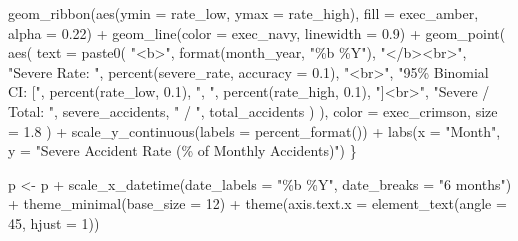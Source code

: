 \documentclass[
  letterpaper,
  DIV=11,
  numbers=noendperiod]{scrartcl}
\newenvironment{Shaded}{\begin{snugshade}}{\end{snugshade}}
\newcommand{\AttributeTok}[1]{\textcolor[rgb]{0.40,0.45,0.13}{#1}}
\newcommand{\DecValTok}[1]{\textcolor[rgb]{0.68,0.00,0.00}{#1}}
\newcommand{\FloatTok}[1]{\textcolor[rgb]{0.68,0.00,0.00}{#1}}
\newcommand{\FunctionTok}[1]{\textcolor[rgb]{0.28,0.35,0.67}{#1}}
\newcommand{\NormalTok}[1]{\textcolor[rgb]{0.00,0.23,0.31}{#1}}
\newcommand{\OtherTok}[1]{\textcolor[rgb]{0.00,0.23,0.31}{#1}}
\newcommand{\SpecialCharTok}[1]{\textcolor[rgb]{0.37,0.37,0.37}{#1}}
\newcommand{\StringTok}[1]{\textcolor[rgb]{0.13,0.47,0.30}{#1}}
\begin{document}
\begin{Shaded}
\begin{Highlighting}[]
        \FunctionTok{geom\_ribbon}\NormalTok{(}\FunctionTok{aes}\NormalTok{(}\AttributeTok{ymin =}\NormalTok{ rate\_low, }\AttributeTok{ymax =}\NormalTok{ rate\_high), }\AttributeTok{fill =}\NormalTok{ exec\_amber, }\AttributeTok{alpha =} \FloatTok{0.22}\NormalTok{) }\SpecialCharTok{+}
        \FunctionTok{geom\_line}\NormalTok{(}\AttributeTok{color =}\NormalTok{ exec\_navy, }\AttributeTok{linewidth =} \FloatTok{0.9}\NormalTok{) }\SpecialCharTok{+}
        \FunctionTok{geom\_point}\NormalTok{(}
          \FunctionTok{aes}\NormalTok{(}
            \AttributeTok{text =} \FunctionTok{paste0}\NormalTok{(}
              \StringTok{"\textless{}b\textgreater{}"}\NormalTok{, }\FunctionTok{format}\NormalTok{(month\_year, }\StringTok{"\%b \%Y"}\NormalTok{), }\StringTok{"\textless{}/b\textgreater{}\textless{}br\textgreater{}"}\NormalTok{,}
              \StringTok{"Severe Rate: "}\NormalTok{, }\FunctionTok{percent}\NormalTok{(severe\_rate, }\AttributeTok{accuracy =} \FloatTok{0.1}\NormalTok{), }\StringTok{"\textless{}br\textgreater{}"}\NormalTok{,}
              \StringTok{"95\% Binomial CI: ["}\NormalTok{, }\FunctionTok{percent}\NormalTok{(rate\_low, }\FloatTok{0.1}\NormalTok{), }\StringTok{", "}\NormalTok{, }\FunctionTok{percent}\NormalTok{(rate\_high, }\FloatTok{0.1}\NormalTok{), }\StringTok{"]\textless{}br\textgreater{}"}\NormalTok{,}
              \StringTok{"Severe / Total: "}\NormalTok{, severe\_accidents, }\StringTok{" / "}\NormalTok{, total\_accidents}
\NormalTok{            )}
\NormalTok{          ),}
          \AttributeTok{color =}\NormalTok{ exec\_crimson, }\AttributeTok{size =} \FloatTok{1.8}
\NormalTok{        ) }\SpecialCharTok{+}
        \FunctionTok{scale\_y\_continuous}\NormalTok{(}\AttributeTok{labels =} \FunctionTok{percent\_format}\NormalTok{()) }\SpecialCharTok{+}
        \FunctionTok{labs}\NormalTok{(}\AttributeTok{x =} \StringTok{"Month"}\NormalTok{, }\AttributeTok{y =} \StringTok{"Severe Accident Rate (\% of Monthly Accidents)"}\NormalTok{)}
\NormalTok{    \}}

\NormalTok{    p }\OtherTok{\textless{}{-}}\NormalTok{ p }\SpecialCharTok{+}
      \FunctionTok{scale\_x\_datetime}\NormalTok{(}\AttributeTok{date\_labels =} \StringTok{"\%b \%Y"}\NormalTok{, }\AttributeTok{date\_breaks =} \StringTok{"6 months"}\NormalTok{) }\SpecialCharTok{+}
      \FunctionTok{theme\_minimal}\NormalTok{(}\AttributeTok{base\_size =} \DecValTok{12}\NormalTok{) }\SpecialCharTok{+}
      \FunctionTok{theme}\NormalTok{(}\AttributeTok{axis.text.x =} \FunctionTok{element\_text}\NormalTok{(}\AttributeTok{angle =} \DecValTok{45}\NormalTok{, }\AttributeTok{hjust =} \DecValTok{1}\NormalTok{))}


\end{Highlighting}
\end{Shaded}
\end{document}
